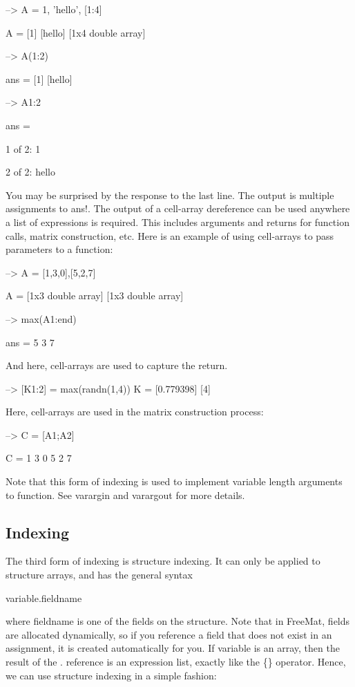 \begin{DoxyVerbInclude}
--> A = {1, 'hello', [1:4]}

A = 
 [1] [hello] [1x4 double array] 

--> A(1:2)

ans = 
 [1] [hello] 

--> A{1:2}

ans = 

1 of 2:
 1 


2 of 2:
hello
\end{DoxyVerbInclude}


You may be surprised by the response to the last line. The output is multiple assignments to {\ttfamily ans}!. The output of a cell-\/array dereference can be used anywhere a list of expressions is required. This includes arguments and returns for function calls, matrix construction, etc. Here is an example of using cell-\/arrays to pass parameters to a function\-:


\begin{DoxyVerbInclude}
--> A = {[1,3,0],[5,2,7]}

A = 
 [1x3 double array] [1x3 double array] 

--> max(A{1:end})

ans = 
 5 3 7 
\end{DoxyVerbInclude}


And here, cell-\/arrays are used to capture the return.


\begin{DoxyVerbInclude}
--> [K{1:2}] = max(randn(1,4))
K = 
 [0.779398] [4] 
\end{DoxyVerbInclude}


Here, cell-\/arrays are used in the matrix construction process\-:


\begin{DoxyVerbInclude}
--> C = [A{1};A{2}]

C = 
 1 3 0 
 5 2 7 
\end{DoxyVerbInclude}


Note that this form of indexing is used to implement variable length arguments to function. See {\ttfamily varargin} and {\ttfamily varargout} for more details. \hypertarget{variables_indexing_Structure}{}\subsection{Indexing}\label{variables_indexing_Structure}
The third form of indexing is structure indexing. It can only be applied to structure arrays, and has the general syntax \begin{DoxyVerb}  variable.fieldname
\end{DoxyVerb}
 where {\ttfamily fieldname} is one of the fields on the structure. Note that in Free\-Mat, fields are allocated dynamically, so if you reference a field that does not exist in an assignment, it is created automatically for you. If variable is an array, then the result of the {\ttfamily .} reference is an expression list, exactly like the {\ttfamily \{\}} operator. Hence, we can use structure indexing in a simple fashion\-:


